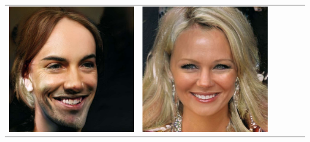 \documentclass[a0,landscape]{a0poster}
\begin{document}
\begin{multicols}{3}
\begin{center}
\begin{tabular}{cc|cc|cc}
\includegraphics[width=\pganw]{../figures/pgan/52_base_iso_MH.jpg} &
\includegraphics[width=\pganw]{../figures/pgan/53_base_iso_MH.jpg} \\

\end{tabular}
\end{center}
\end{multicols}
\end{document}
